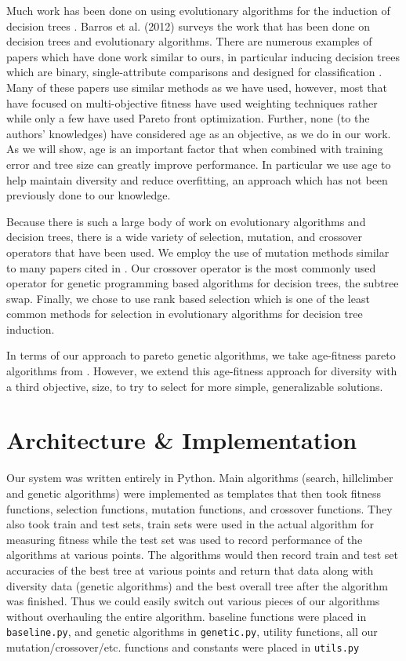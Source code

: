 \documentclass{acm_proc_article-sp}
\begin{document}
Much work has been done on using evolutionary algorithms for the induction of decision trees \cite{barros2012}. Barros et al. (2012) surveys the work that has been done on decision trees and evolutionary algorithms. There are numerous examples of papers which have done work similar to ours, in particular inducing decision trees which are binary, single-attribute comparisons and designed for classification \cite{barros2012}. Many of these papers use similar methods as we have used, however, most that have focused on multi-objective fitness have used weighting techniques rather while only a few have used Pareto front optimization. Further, none (to the authors' knowledges) have considered age as an objective, as we do in our work. As we will show, age is an important factor that when combined with training error and tree size can greatly improve performance. In particular we use age to help maintain diversity and reduce overfitting, an approach which has not been previously done to our knowledge.

Because there is such a large body of work on evolutionary algorithms and decision trees, there is a wide variety of selection, mutation, and crossover operators that have been used. We employ the use of mutation methods similar to many papers cited in \cite{barros2012}. Our crossover operator is the most commonly used operator for genetic programming based algorithms for decision trees, the subtree swap. Finally, we chose to use rank based selection which is one of the least common methods for selection in evolutionary algorithms for decision tree induction.

In terms of our approach to pareto genetic algorithms, we take age-fitness pareto algorithms from \cite{schmidt2011}. However, we extend this age-fitness approach for diversity with a third objective, size, to try to select for more simple, generalizable solutions.

\section{Architecture \& Implementation}

Our system was written entirely in Python. Main algorithms (search, hillclimber and genetic algorithms) were implemented as templates that then took fitness functions, selection functions, mutation functions, and crossover functions. They also took train and test sets, train sets were used in the actual algorithm for measuring fitness while the test set was used to record performance of the algorithms at various points. The algorithms would then record train and test set accuracies of the best tree at various points and return that data along with diversity data (genetic algorithms) and the best overall tree after the algorithm was finished. Thus we could easily switch out various pieces of our algorithms without overhauling the entire algorithm. baseline functions were placed in \texttt{baseline.py}, and genetic algorithms in \texttt{genetic.py}, utility functions, all our mutation/crossover/etc. functions and constants were placed in \texttt{utils.py}
\end{document}
